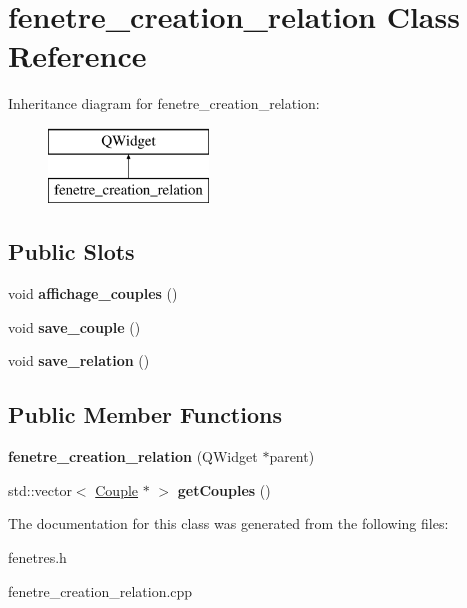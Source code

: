 \hypertarget{classfenetre__creation__relation}{}\section{fenetre\+\_\+creation\+\_\+relation Class Reference}
\label{classfenetre__creation__relation}
Inheritance diagram for fenetre\+\_\+creation\+\_\+relation\+:\begin{figure}[H]
\begin{center}
\leavevmode
\includegraphics[height=2.000000cm]{classfenetre__creation__relation}
\end{center}
\end{figure}
\subsection*{Public Slots}
\begin{DoxyCompactItemize}
\item 
\mbox{\label{classfenetre__creation__relation_ac5b715961f109f3bb403d8ca37faed71}} 
void {\bfseries affichage\+\_\+couples} ()
\item 
\mbox{\label{classfenetre__creation__relation_ad8b233b34d0e2775108683e09a8d966d}} 
void {\bfseries save\+\_\+couple} ()
\item 
\mbox{\label{classfenetre__creation__relation_af9891e79cff26ef704cfdae9cfa46752}} 
void {\bfseries save\+\_\+relation} ()
\end{DoxyCompactItemize}
\subsection*{Public Member Functions}
\begin{DoxyCompactItemize}
\item 
\mbox{\label{classfenetre__creation__relation_ae7f98f1b23dbe45b922b61293348a07f}} 
{\bfseries fenetre\+\_\+creation\+\_\+relation} (Q\+Widget $\ast$parent)
\item 
\mbox{\label{classfenetre__creation__relation_a843417e0a1f6350f8a3919eb92cf67dd}} 
std\+::vector$<$ \hyperlink{class_couple}{Couple} $\ast$ $>$ {\bfseries get\+Couples} ()
\end{DoxyCompactItemize}


The documentation for this class was generated from the following files\+:\begin{DoxyCompactItemize}
\item 
fenetres.\+h\item 
fenetre\+\_\+creation\+\_\+relation.\+cpp\end{DoxyCompactItemize}
